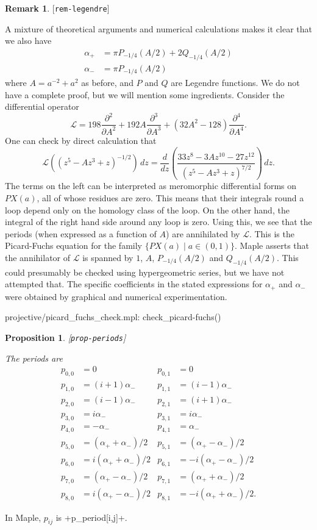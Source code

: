 \documentclass[reqno]{amsart}
\newcommand{\lbl}[1]{\label{#1}\textup{[\texttt{#1}]}\par}
\newcommand{\lbl}{\label}
\newcommand{\al}        {\alpha}
\newcommand{\st}        {\;|\;}
\newcommand{\CL}        {\mathcal{L}}
\renewcommand{\:}{\colon}
\newtheorem{proposition}[theorem]{Proposition}
\theoremstyle{definition}
\newtheorem{remark}[theorem]{Remark}
\begin{document}
\begin{remark}\lbl{rem-legendre}
 A mixture of theoretical arguments and numerical calculations makes
 it clear that we also have
 \begin{align*}
  \al_+ &= \pi P_{-1/4}(A/2) + 2Q_{-1/4}(A/2) \\
  \al_- &= \pi P_{-1/4}(A/2)
 \end{align*}
 where $A=a^{-2}+a^2$ as before, and $P$ and $Q$ are Legendre
 functions.  We do not have a complete proof, but we will mention some
 ingredients.  Consider the differential operator
 \[ \CL =
     198 \frac{\partial^2}{\partial A^2} +
     192 A \frac{\partial^3}{\partial A^3} +
     (32A^2 - 128) \frac{\partial^4}{\partial A^4}.
 \]
 One can check by direct calculation that
 \[ \CL((z^5-Az^3+z)^{-1/2}) \,dz =
      \frac{d}{dz}\left(
       \frac{33z^8-3Az^{10}-27z^{12}}{(z^5-Az^3+z)^{7/2}}
      \right) \,dz.
 \]
 The terms on the left can be interpreted as meromorphic differential
 forms on $PX(a)$, all of whose residues are zero.  This means that
 their integrals round a loop depend only on the homology class of the
 loop.  On the other hand, the integral of the right hand side around
 any loop is zero.  Using this, we see that the periods (when
 expressed as a function of $A$) are annihilated by $\CL$.  This is
 the Picard-Fuchs equation for the family $\{PX(a)\st a\in(0,1)\}$.
 Maple asserts that the annihilator of $\CL$ is spanned by $1$, $A$,
 $P_{-1/4}(A/2)$ and $Q_{-1/4}(A/2)$.  This could presumably be
 checked using hypergeometric series, but we have not attempted that.
 The specific coefficients in the stated expressions for $\al_+$ and
 $\al_-$ were obtained by graphical and numerical experimentation.
 \begin{checks}
  projective/picard_fuchs_check.mpl: check_picard-fuchs()
 \end{checks}
\end{remark}

\begin{proposition}\lbl{prop-periods}
 The periods are
 \begin{align*}
  p_{0,0} &=          0       & p_{0,1} &= 0          \\
  p_{1,0} &= (i+1)\al_-       & p_{1,1} &= (i-1)\al_- \\
  p_{2,0} &= (i-1)\al_-       & p_{2,1} &= (i+1)\al_- \\
  p_{3,0} &=     i\al_-       & p_{3,1} &=     i\al_- \\
  p_{4,0} &=     -\al_-       & p_{4,1} &=      \al_- \\
  p_{5,0} &=  (\al_++\al_-)/2 & p_{5,1} &=   (\al_+-\al_-)/2 \\
  p_{6,0} &= i(\al_++\al_-)/2 & p_{6,1} &= -i(\al_+-\al_-)/2 \\
  p_{7,0} &=  (\al_+-\al_-)/2 & p_{7,1} &=   (\al_++\al_-)/2 \\
  p_{8,0} &= i(\al_+-\al_-)/2 & p_{8,1} &= -i(\al_++\al_-)/2.
 \end{align*}
\end{proposition}
In Maple, $p_{ij}$ is \mcode+p_period[i,j]+.
\end{document}

